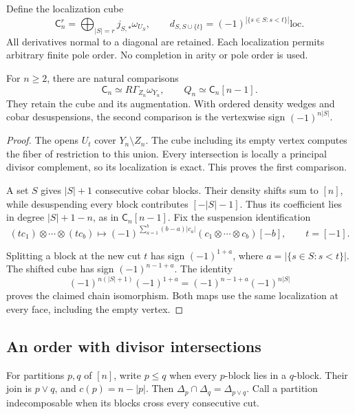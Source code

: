 Define the localization cube
\begin{equation}\label{v4-eq:singular-vacuum-cube}
 \mathsf C_n^r=\bigoplus_{|S|=r}j_{S,*}\omega_{U_S},
 \qquad
 d_{S,S\cup\{t\}}
       =(-1)^{|\{s\in S:s<t\}|}\mathrm{loc}.
\end{equation}
All derivatives normal to a diagonal are retained.
Each localization permits arbitrary finite pole
order. No completion in arity or pole order
is used.

\begin{proposition}\label{v4-prop:singular-vacuum-coefficient}
For \(n\geq2\), there are natural comparisons
\[
 \mathsf C_n\simeq R\Gamma_{Z_n}\omega_{Y_n},
 \qquad Q_n\simeq\mathsf C_n[n-1].
\]
They retain the cube and its augmentation.
With ordered density wedges and cobar
desuspensions, the second comparison is
the vertexwise sign \((-1)^{n|S|}\).
\end{proposition}

\begin{proof}
The opens \(U_t\) cover \(Y_n\setminus Z_n\).
The cube including its empty vertex computes
the fiber of restriction to this union.
Every intersection is locally a principal
divisor complement, so its localization is exact.
This proves the first comparison.

A set \(S\) gives \(|S|+1\) consecutive
cobar blocks. Their density shifts sum
to \([n]\), while desuspending every block
contributes \([-|S|-1]\).
Thus its coefficient lies in degree
\(|S|+1-n\), as in \(\mathsf C_n[n-1]\).
Fix the suspension identification
\[
 (tc_1)\otimes\cdots\otimes(tc_b)
   \longmapsto
 (-1)^{\sum_{a=1}^b(b-a)|c_a|}
                 (c_1\otimes\cdots\otimes c_b)[-b],
 \qquad t=[-1].
\]

Splitting a block at the new cut \(t\)
has sign \((-1)^{1+a}\), where
\(a=|\{s\in S:s<t\}|\).
The shifted cube has sign \((-1)^{n-1+a}\).
The identity
\[
 (-1)^{n(|S|+1)}(-1)^{1+a}
             =(-1)^{n-1+a}(-1)^{n|S|}
\]
proves the claimed chain isomorphism.
Both maps use the same localization at
every face, including the empty vertex.
\end{proof}

\subsection{An order with divisor intersections}

For partitions \(p,q\) of \([n]\), write
\(p\leq q\) when every \(p\)-block
lies in a \(q\)-block. Their join is
\(p\vee q\), and \(c(p)=n-|p|\).
Then
\(\Delta_p\cap\Delta_q=\Delta_{p\vee q}\).
Call a partition indecomposable when
its blocks cross every consecutive cut.

